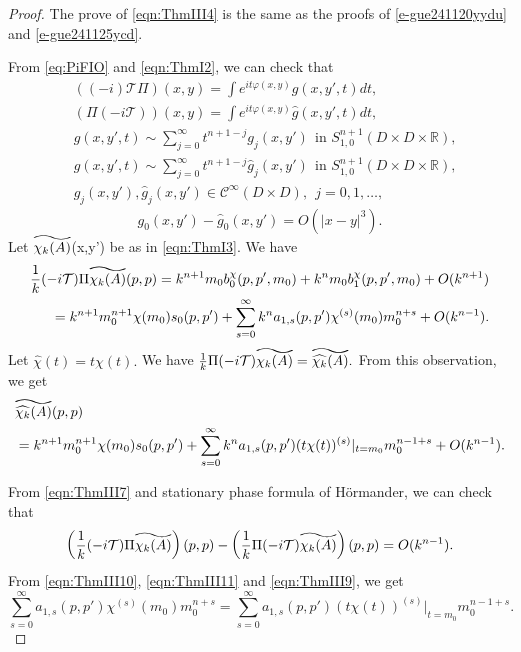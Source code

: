 \documentclass[12pt]{amsart}
\theoremstyle{definition}
\theoremstyle{named}
\numberwithin{equation}{subsection}
\newcommand{\abs}[1]{\left\vert#1\right\vert}
\def\cC{\mathscr{C}}
\newcommand\reallywidetilde[1]{\ThisStyle{%
  \setbox0=\hbox{$\SavedStyle#1$}%
  \stackengine{-.1\LMpt}{$\SavedStyle#1$}{%
    \stretchto{\scaleto{\SavedStyle\mkern.2mu\AC}{.5150\wd0}}{.6\ht0}%
  }{O}{c}{F}{T}{S}%
}}
\begin{document}
\begin{proof}
The prove of \eqref{eqn:ThmIII4} is the same as the proofs of \eqref{e-gue241120yydu} and \eqref{e-gue241125ycd}. 
   
   From \eqref{eq:PiFIO} and \eqref{eqn:ThmI2}, we can check that  
    \[\begin{split}
        &\left((-i)\mathcal{T}\Pi\right)(x,y)=\int e^{it\varphi(x,y)}g(x,y',t)dt,\\
        &\left(\Pi(-i\mathcal{T})\right)(x,y)=\int e^{it\varphi(x,y)}\hat g(x,y',t)dt,\\
        &g(x,y',t)\sim\sum^{\infty}_{j=0}t^{n+1-j}g_j(x,y')\ \ \mbox{in $S^{n+1}_{1,0}(D\times D\times\mathbb R)$},\\
        &\hat g(x,y',t)\sim\sum^{\infty}_{j=0}t^{n+1-j}\hat g_j(x,y')\ \ \mbox{in $S^{n+1}_{1,0}(D\times D\times\mathbb R)$},\\
        &g_j(x,y'), \hat g_j(x,y')\in\cC^\infty(D\times D),\ \ j=0,1,\ldots,
        \end{split}\]
    \begin{equation}\label{eqn:ThmIII7}
    g_0(x,y')-\hat g_0(x,y')=O(\abs{x-y}^3).
    \end{equation}
    Let $\reallywidetilde{\chi_k(A)}$(x,y') be as in \eqref{eqn:ThmI3}. We have 
\begin{align}
        \frac{1}{k}(-i\mathcal{T})\Pi\reallywidetilde{\chi_k(A)}(p,p)=k^{n+1}m_0b^\chi_0(p,p',m_0)+k^nm_0b^\chi_1(p,p',m_0)+O(k^{n+1})\nonumber\\=k^{n+1}m_0^{n+1}\chi(m_0)s_0(p,p')+\sum^{\infty}_{s=0}k^na_{1,s}(p,p')\chi^{(s)}(m_0)m_0^{n+s}+O(k^{n-1}). \label{eqn:ThmIII10}
    \end{align}
Let $\widehat{\chi}(t)=t\chi(t).$ We have $\frac{1}{k}\Pi(-i\mathcal{T})\reallywidetilde{\chi_k(A)}=\reallywidetilde{\widehat{\chi_k}(A)}.$ From this observation, we get 
    \begin{equation}\label{eqn:ThmIII11}
    \begin{split}
        &\reallywidetilde{\widehat{\chi_k}(A)}(p,p)\\
&=k^{n+1}m_0^{n+1}\chi(m_0)s_0(p,p')+\sum^{\infty}_{s=0}k^na_{1,s}(p,p')(t\chi(t))^{(s)}|_{t=m_0}m_0^{n-1+s}+O(k^{n-1}).
    \end{split}
    \end{equation}

From \eqref{eqn:ThmIII7} and stationary phase formula of H\"ormander, we can check that 
    \begin{equation}\label{eqn:ThmIII9}
        \left(\frac{1}{k}(-i\mathcal{T})\Pi\reallywidetilde{\chi_k(A)}\right)(p,p)-\left(\frac{1}{k}\Pi(-i\mathcal{T})\reallywidetilde{\chi_k(A)}\right)(p,p)=O(k^{n-1}).
    \end{equation}
    From \eqref{eqn:ThmIII10}, \eqref{eqn:ThmIII11} and \eqref{eqn:ThmIII9}, we get 
    \begin{equation}\label{eqn:ThmIII12}
        \sum^{\infty}_{s=0}a_{1,s}(p,p')\chi^{(s)}(m_0)m_0^{n+s}=\sum^{\infty}_{s=0}a_{1,s}(p,p')(t\chi(t))^{(s)}|_{t=m_0}m_0^{n-1+s}.
    \end{equation}


\end{proof}
\end{document}
